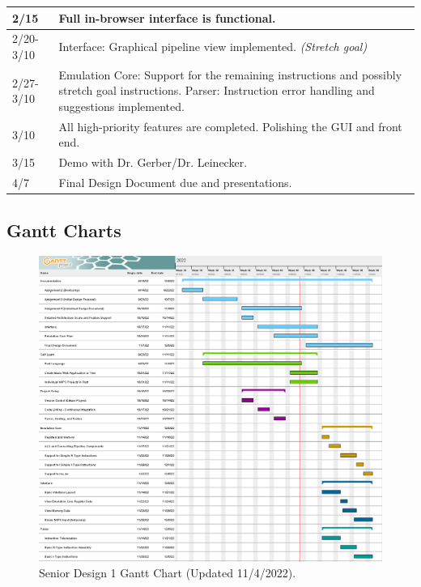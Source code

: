 \documentclass[
    paper=letter,
    parskip=half,
    fontsize=12pt,
    titlepage=firstiscover,
    toc=bibliography,
    numbers=endperiod
]{scrartcl}
\begin{document}
{\begin{tabularx}{\textwidth}{|l|X|}
        2/15          & Full in-browser interface is functional. \\\hline
        2/20-3/10     & Interface: Graphical pipeline view implemented. \emph{(Stretch goal)} \\\hline
        2/27-3/10     & Emulation Core: Support for the remaining instructions and possibly stretch goal instructions. \newline Parser: Instruction error handling and suggestions implemented. \\\hline
        3/10          & All high-priority features are completed. Polishing the GUI and front end. \\\hline
        3/15          & Demo with Dr. Gerber/Dr. Leinecker. \\\hline
        4/7           & Final Design Document due and presentations. \\\hline
\end{tabularx}}



\subsection{Gantt Charts}

\begin{figure}[H]
    \includegraphics[width=\textwidth]{gantt-sd1}
    \caption{Senior Design 1 Gantt Chart (Updated 11/4/2022).}
\end{figure}
\end{document}
